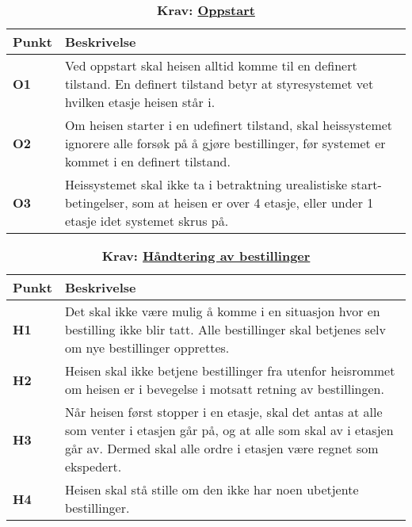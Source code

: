 \begin{table}[ht]
    \centering
    \caption*{\textbf{\textcolor{NTNU_blue}{Krav}: \underline{Oppstart}}}
    \begin{tabular}{@{}  |p{1.25cm}| p{12.25cm}|  @{}}
    \hline
    \textbf{Punkt}             & \textbf{Beskrivelse} \\
    \hline
    \textbf{\textcolor{NTNU_blue}{O1}} & Ved oppstart skal heisen alltid komme til en definert tilstand. En definert tilstand betyr at styresystemet vet hvilken etasje heisen står i.\\\cline{1-2} 
    \textbf{\textcolor{NTNU_blue}{O2}} & Om heisen starter i en udefinert tilstand, skal heissystemet ignorere alle forsøk på å gjøre bestillinger, før systemet er kommet i en definert tilstand.\\\cline{1-2} 
    \textbf{\textcolor{NTNU_blue}{O3}} & Heissystemet skal ikke ta i betraktning urealistiske start-betingelser, som at heisen er over 4 etasje, eller under 1 etasje idet systemet skrus på.\\\cline{1-2} 
    \end{tabular}
\end{table}


\begin{table}[ht]
    \centering
    \caption*{\textbf{\textcolor{NTNU_blue}{Krav}: \underline{Håndtering av bestillinger}}}
    \begin{tabular}{@{}  |p{1.25cm}| p{12.25cm}|  @{}}
    \hline
    \textbf{Punkt}             & \textbf{Beskrivelse} \\
    \hline
    \textbf{\textcolor{NTNU_blue}{H1}} & Det skal ikke være mulig å komme i en situasjon hvor en bestilling ikke blir tatt. Alle bestillinger skal betjenes selv om nye bestillinger opprettes.\\\cline{1-2} 
    \textbf{\textcolor{NTNU_blue}{H2}} & Heisen skal ikke betjene bestillinger fra utenfor heisrommet om heisen er i bevegelse i motsatt retning av bestillingen.\\\cline{1-2} 
    \textbf{\textcolor{NTNU_blue}{H3}} & Når heisen først stopper i en etasje, skal det antas at alle som venter i etasjen går på, og at alle som skal av i etasjen går av. Dermed skal alle ordre i etasjen være regnet som ekspedert.\\\cline{1-2} 
    \textbf{\textcolor{NTNU_blue}{H4}} & Heisen skal stå stille om den ikke har noen ubetjente bestillinger.\\\cline{1-2}
    \end{tabular}
\end{table}




